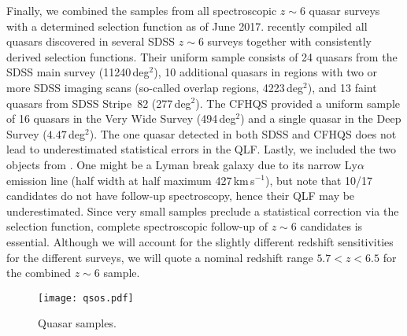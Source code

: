 \documentclass[a4paper,fleqn,usenatbib]{mnras}
\begin{document}
Finally, we combined the samples from all spectroscopic $z\sim 6$
quasar surveys with a determined selection function as of June
2017. \citet{2016ApJ...833..222J} recently compiled all quasars
discovered in several SDSS $z\sim 6$ surveys together with
consistently derived selection functions. Their uniform sample
consists of 24 quasars from the SDSS main survey (11240\,deg$^2$), 10
additional quasars in regions with two or more SDSS imaging scans
(so-called overlap regions, 4223\,deg$^2$), and 13 faint quasars from
SDSS Stripe~82 (277\,deg$^2$). The CFHQS \citep{2010AJ....139..906W}
provided a uniform sample of 16 quasars in the Very Wide Survey
(494\,deg$^2$) and a single quasar in the Deep Survey
($4.47$\,deg$^2$). The one quasar detected in both SDSS and CFHQS does
not lead to underestimated statistical errors in the QLF. Lastly, we
included the two objects from \citet{2015ApJ...798...28K}. One might
be a Lyman break galaxy due to its narrow Ly$\alpha$ emission line
(half width at half maximum 427\,km\,s$^{-1}$), but
\citet{2015ApJ...798...28K} note that 10/17 candidates do not have
follow-up spectroscopy, hence their QLF may be underestimated. Since
very small samples preclude a statistical correction via the selection
function, complete spectroscopic follow-up of $z\sim 6$ candidates is
essential. Although we will account for the slightly different
redshift sensitivities for the different surveys, we will quote a
nominal redshift range $5.7<z<6.5$ for the combined $z\sim 6$ sample.


\begin{figure*}
  \begin{center}
    \texttt{[image: qsos.pdf]}
  \end{center}
  \caption{Quasar samples.}
  \label{fig:qsos}
\end{figure*}
\end{document}
